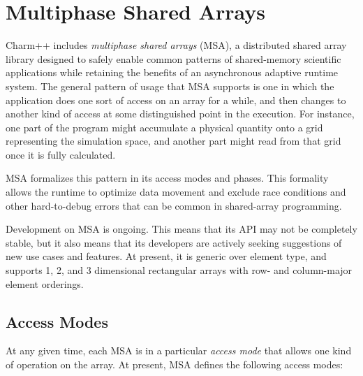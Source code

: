 \section{Multiphase Shared Arrays}
\label{msa}

Charm++ includes \emph{multiphase shared arrays} (MSA), a distributed
shared array library designed to safely enable common patterns of
shared-memory scientific applications while retaining the benefits of
an asynchronous adaptive runtime system. The general pattern of usage
that MSA supports is one in which the application does one sort of
access on an array for a while, and then changes to another kind of
access at some distinguished point in the execution. For instance, one
part of the program might accumulate a physical quantity onto a grid
representing the simulation space, and another part might read from
that grid once it is fully calculated.

MSA formalizes this pattern in its access modes and phases. This
formality allows the runtime to optimize data movement and exclude
race conditions and other hard-to-debug errors that can be common in
shared-array programming.

Development on MSA is ongoing. This means that its API may not be
completely stable, but it also means that its developers are actively
seeking suggestions of new use cases and features. At present, it is
generic over element type, and supports 1, 2, and 3 dimensional
rectangular arrays with row- and column-major element orderings.

\subsection{Access Modes}

At any given time, each MSA is in a particular \emph{access mode} that
allows one kind of operation on the array. At present, MSA defines the
following access modes:

